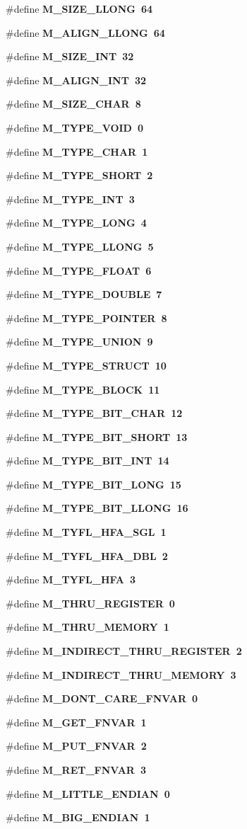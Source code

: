 \begin{CompactItemize}
\#define \bf{M\_\-SIZE\_\-LLONG}~64
\item 
\#define \bf{M\_\-ALIGN\_\-LLONG}~64
\item 
\#define \bf{M\_\-SIZE\_\-INT}~32
\item 
\#define \bf{M\_\-ALIGN\_\-INT}~32
\item 
\#define \bf{M\_\-SIZE\_\-CHAR}~8
\item 
\#define \bf{M\_\-TYPE\_\-VOID}~0
\item 
\#define \bf{M\_\-TYPE\_\-CHAR}~1
\item 
\#define \bf{M\_\-TYPE\_\-SHORT}~2
\item 
\#define \bf{M\_\-TYPE\_\-INT}~3
\item 
\#define \bf{M\_\-TYPE\_\-LONG}~4
\item 
\#define \bf{M\_\-TYPE\_\-LLONG}~5
\item 
\#define \bf{M\_\-TYPE\_\-FLOAT}~6
\item 
\#define \bf{M\_\-TYPE\_\-DOUBLE}~7
\item 
\#define \bf{M\_\-TYPE\_\-POINTER}~8
\item 
\#define \bf{M\_\-TYPE\_\-UNION}~9
\item 
\#define \bf{M\_\-TYPE\_\-STRUCT}~10
\item 
\#define \bf{M\_\-TYPE\_\-BLOCK}~11
\item 
\#define \bf{M\_\-TYPE\_\-BIT\_\-CHAR}~12
\item 
\#define \bf{M\_\-TYPE\_\-BIT\_\-SHORT}~13
\item 
\#define \bf{M\_\-TYPE\_\-BIT\_\-INT}~14
\item 
\#define \bf{M\_\-TYPE\_\-BIT\_\-LONG}~15
\item 
\#define \bf{M\_\-TYPE\_\-BIT\_\-LLONG}~16
\item 
\#define \bf{M\_\-TYFL\_\-HFA\_\-SGL}~1
\item 
\#define \bf{M\_\-TYFL\_\-HFA\_\-DBL}~2
\item 
\#define \bf{M\_\-TYFL\_\-HFA}~3
\item 
\#define \bf{M\_\-THRU\_\-REGISTER}~0
\item 
\#define \bf{M\_\-THRU\_\-MEMORY}~1
\item 
\#define \bf{M\_\-INDIRECT\_\-THRU\_\-REGISTER}~2
\item 
\#define \bf{M\_\-INDIRECT\_\-THRU\_\-MEMORY}~3
\item 
\#define \bf{M\_\-DONT\_\-CARE\_\-FNVAR}~0
\item 
\#define \bf{M\_\-GET\_\-FNVAR}~1
\item 
\#define \bf{M\_\-PUT\_\-FNVAR}~2
\item 
\#define \bf{M\_\-RET\_\-FNVAR}~3
\item 
\#define \bf{M\_\-LITTLE\_\-ENDIAN}~0
\item 
\#define \bf{M\_\-BIG\_\-ENDIAN}~1
\end{CompactItemize}
